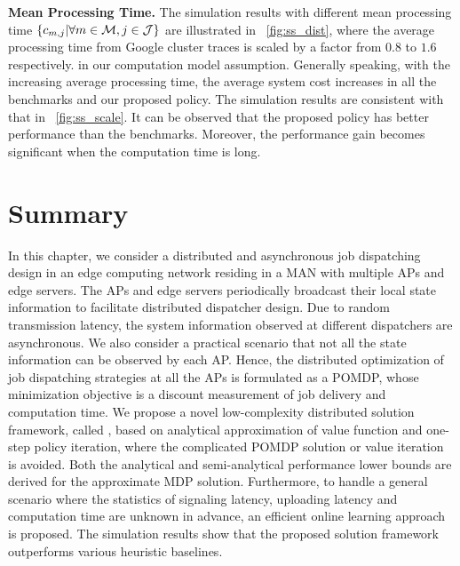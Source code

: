 \noindent\textbf{Mean Processing Time.}
The simulation results with different mean processing time $\{c_{m,j}|\forall m\in\mathcal{M},j\in\mathcal{J}\}$ are illustrated in \figurename~\ref{fig:ss_dist}, where the average processing time from Google cluster traces is scaled by a factor from $0.8$ to $1.6$ respectively.
in our computation model assumption.
Generally speaking, with the increasing average processing time, the average system cost increases in all the benchmarks and our proposed policy.
The simulation results are consistent with that in \figurename~\ref{fig:ss_scale}.
It can be observed that the proposed policy has better performance than the benchmarks.
Moreover, the performance gain becomes significant when the computation time is long.


\section{Summary}
\label{sec:chapter3-conclusion}
In this chapter, we consider a distributed and asynchronous job dispatching design in an edge computing network residing in a MAN with multiple APs and edge servers.
The APs and edge servers periodically broadcast their local state information to facilitate distributed dispatcher design.
Due to random transmission latency, the system information observed at different dispatchers are asynchronous.
We also consider a practical scenario that not all the state information can be observed by each AP.
Hence, the distributed optimization of job dispatching strategies at all the APs is formulated as a POMDP, whose minimization objective is a discount measurement of job delivery and computation time.
We propose a novel low-complexity distributed solution framework, called {\Dalgname}, based on analytical approximation of value function and one-step policy iteration, where the complicated POMDP solution or value iteration is avoided. Both the analytical and semi-analytical performance lower bounds are derived for the approximate MDP solution.
Furthermore, to handle a general scenario where the statistics of signaling latency, uploading latency and computation time are unknown in advance, an efficient online learning approach is proposed.
The simulation results show that the proposed solution framework outperforms various heuristic baselines.
